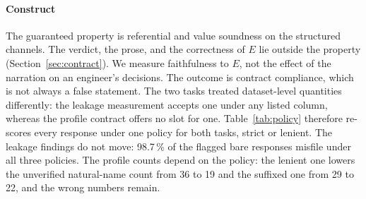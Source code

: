 \documentclass[smallextended,natbib]{svjour3}
\begin{document}
\paragraph{Construct}
The guaranteed property is referential and value soundness on the structured
channels. The verdict, the prose, and the correctness of $E$ lie outside the
property (Section~\ref{sec:contract}). We measure faithfulness to $E$, not the
effect of the narration on an engineer's decisions. The outcome is contract
compliance, which is not always a false statement. The two tasks treated
dataset-level quantities differently: the leakage measurement accepts one
under any listed column, whereas the profile contract offers no slot for one.
Table~\ref{tab:policy} therefore re-scores every response under one policy
for both tasks, strict or lenient. The leakage findings do not move: 98.7\,\%
of the flagged bare responses misfile under all three policies. The profile
counts depend on the policy: the lenient one lowers the unverified natural-name
count from 36 to 19 and the suffixed one from 29 to 22, and the wrong numbers
remain.
\end{document}
